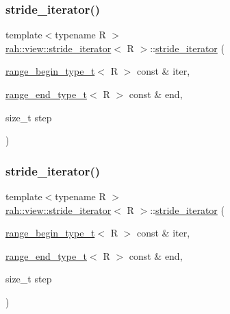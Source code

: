 \subsubsection{\texorpdfstring{stride\_iterator()}{stride\_iterator()}\hspace{0.1cm}{\footnotesize\ttfamily [1/2]}}
{\footnotesize\ttfamily template$<$typename R $>$ \\
\mbox{\hyperlink{structrah_1_1view_1_1stride__iterator}{rah\+::view\+::stride\+\_\+iterator}}$<$ R $>$\+::\mbox{\hyperlink{structrah_1_1view_1_1stride__iterator}{stride\+\_\+iterator}} (\begin{DoxyParamCaption}\item[{\mbox{\hyperlink{namespacerah_a28aff4eeddcece6be65ff0b956d32d4a}{range\+\_\+begin\+\_\+type\+\_\+t}}$<$ R $>$ const \&}]{iter,  }\item[{\mbox{\hyperlink{namespacerah_a9657e24ae477f4482225b133fe286b65}{range\+\_\+end\+\_\+type\+\_\+t}}$<$ R $>$ const \&}]{end,  }\item[{size\+\_\+t}]{step }\end{DoxyParamCaption})\hspace{0.3cm}{\ttfamily [inline]}}

\mbox{\label{structrah_1_1view_1_1stride__iterator_a47ddd2ce0f295fa825919f04431d64a9}} 
\subsubsection{\texorpdfstring{stride\_iterator()}{stride\_iterator()}\hspace{0.1cm}{\footnotesize\ttfamily [2/2]}}
{\footnotesize\ttfamily template$<$typename R $>$ \\
\mbox{\hyperlink{structrah_1_1view_1_1stride__iterator}{rah\+::view\+::stride\+\_\+iterator}}$<$ R $>$\+::\mbox{\hyperlink{structrah_1_1view_1_1stride__iterator}{stride\+\_\+iterator}} (\begin{DoxyParamCaption}\item[{\mbox{\hyperlink{namespacerah_a28aff4eeddcece6be65ff0b956d32d4a}{range\+\_\+begin\+\_\+type\+\_\+t}}$<$ R $>$ const \&}]{iter,  }\item[{\mbox{\hyperlink{namespacerah_a9657e24ae477f4482225b133fe286b65}{range\+\_\+end\+\_\+type\+\_\+t}}$<$ R $>$ const \&}]{end,  }\item[{size\+\_\+t}]{step }\end{DoxyParamCaption})\hspace{0.3cm}{\ttfamily [inline]}}



